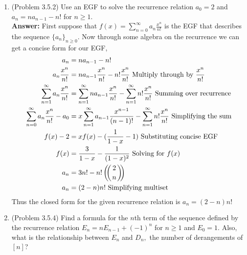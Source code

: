 \documentclass{amsart}
\def\multiset#1#2{\ensuremath{\left(\kern-.3em\left(\genfrac{}{}{0pt}{}{#1}{#2}\right)\kern-.3em\right)}}
\newcommand{\textmultiset}[2]{\bigl(\!{\binom{#1}{#2}}\!\bigr)}
\newcommand{\displaymultiset}[2]{\left(\!{\binom{#1}{#2}}\!\right)}
\newcommand\multiset[2]{\mathchoice{\displaymultiset{#1}{#2}}
                                {\textmultiset{#1}{#2}}
                                {\textmultiset{#1}{#2}}
                                {\textmultiset{#1}{#2}}}
\begin{document}
\begin{enumerate}
\item (Problem 3.5.2) Use an EGF to solve the recurrence relation $a_0=2$ and $a_n=na_{n-1}-n!$ for $n \geq 1.$\\
	\textbf{Answer:} First suppose that $f(x) = \sum_{n = 0}^{\infty} a_n \frac{x^n}{n!}$ is the EGF that describes the sequence $\{a_n\}_{n\geq0}$. Now through some algebra on the recurrence we can get a concise form for our EGF,\\
	 \begin{align*}
	 a_n&=na_{n-1}-n! \\
	 a_n\frac{x^n}{n!}&=na_{n-1}\frac{x^n}{n!}-n!\frac{x^n}{n!}  \text{   Multiply through by $\frac{x^n}{n!}$}\\
	 \sum_{n = 1}^{\infty} a_n\frac{x^n}{n!}&=\sum_{n = 1}^{\infty}na_{n-1}\frac{x^n}{n!}-\sum_{n = 1}^{\infty}n!\frac{x^n}{n!}   \text{ Summing over recurrence} \\
	 \sum_{n = 0}^{\infty} a_n\frac{x^n}{n!} - a_0 &=x\sum_{n = 1}^{\infty}a_{n-1}\frac{x^{n-1}}{(n-1)!}-\sum_{n = 1}^{\infty}n!\frac{x^n}{n!}   \text{ Simplifying the sum} \\
	  f(x) - 2 &=xf(x)-(\frac{1}{1-x} - 1) \text{   Substituting concise EGF} \\
	  f(x) &= \frac{3}{1-x}-\frac{1}{(1-x)^2} \text{   Solving for $f(x)$}\\
	  a_n &= 3n! - n!\multiset{2}{n}\\
	   a_n &= (2-n)n!  \text{   Simplifying multiset}
	 \end{align*}
	  Thus the closed form for the given recurrence relation is $a_n =(2-n)n!$
	\vspace{.5 in}


\item (Problem 3.5.4) Find a formula for the $n$th term of the sequence defined by the recurrence relation $E_n=nE_{n-1}+(-1)^n$ for $n \geq 1$ and $E_0=1.$ Also, what is the relationship between $E_n$ and $D_n,$ the number of derangements of $[n]$?\\


\end{enumerate}
\end{document}
